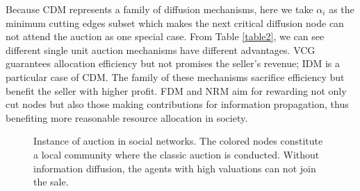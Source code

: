\documentclass{article}
\begin{document}
Because CDM represents a family of diffusion mechanisms, here we take $\alpha_i$ as the minimum cutting edges subset which makes the next critical diffusion node can not attend the auction as one special case. From Table \ref{table2}, we can see different single unit auction mechanisms have different advantages. VCG guarantees allocation efficiency but not promises the seller's revenue; IDM is a particular case of CDM. The family of these mechanisms sacrifice efficiency but benefit the seller with higher profit. FDM and NRM aim for rewarding not only cut nodes but also those making contributions for information propagation, thus benefiting more reasonable resource allocation in society.
\begin{figure}[!htbp]
    \centering
    \caption{Instance of auction in social networks. The colored nodes constitute a local community where the classic auction is conducted. Without information diffusion, the agents with high valuations can not join the sale.}
    \label{fig2}
\end{figure}
\end{document}
